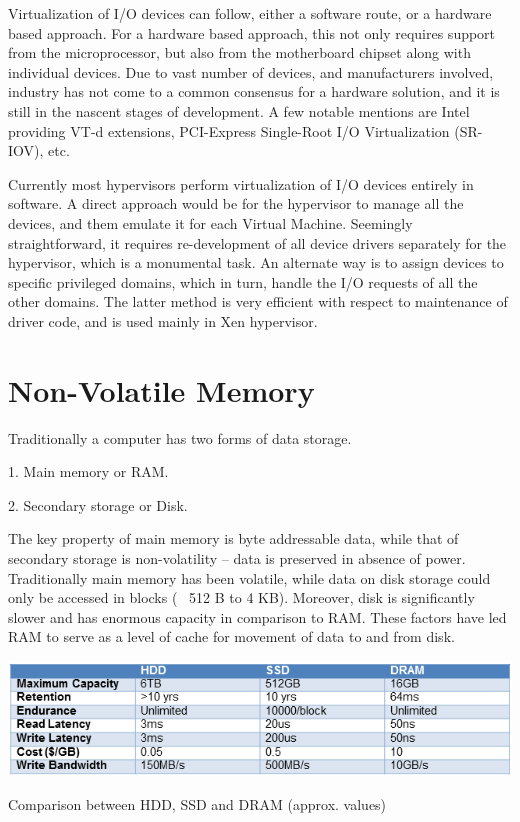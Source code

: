 Virtualization of I/O devices can follow, either a software route, or a hardware based approach. For a hardware based approach, this not only requires support from the microprocessor, but also from the motherboard chipset along with individual devices. Due to vast number of devices, and manufacturers involved, industry has not come to a common consensus for a hardware solution, and it is still in the nascent stages of development. A few notable mentions are Intel providing VT-d extensions, PCI-Express Single-Root I/O Virtualization (SR-IOV), etc.

Currently most hypervisors perform virtualization of I/O devices entirely in software. A direct approach would be for the hypervisor to manage all the devices, and them emulate it for each Virtual Machine. Seemingly straightforward, it requires re-development of all device drivers separately for the hypervisor, which is a monumental task. An alternate way is to assign devices to specific privileged domains, which in turn, handle the I/O requests of all the other domains. The latter method is very efficient with respect to maintenance of driver code, and is used mainly in Xen hypervisor. 


\section{Non-Volatile Memory}

Traditionally a computer has two forms of data storage.

1. Main memory or RAM.

2. Secondary storage or Disk.

The key property of main memory is byte addressable data, while that of secondary storage is non-volatility -- data is preserved in absence of power. Traditionally main memory has been volatile, while data on disk storage could only be accessed in blocks (~ 512 B to 4 KB). Moreover, disk is significantly slower and has enormous capacity in comparison to RAM. These factors have led RAM to serve as a level of cache for movement of data to and from disk. 

\setlength{\belowcaptionskip}{-10pt}

\begin{table}[H]
  \centering
  \includegraphics[scale=0.6]{figures/nvmemorytable.png}
  \caption{Comparison between HDD, SSD and DRAM (approx. values)}
  \label{tab:nvmemtable}
\end{table}

